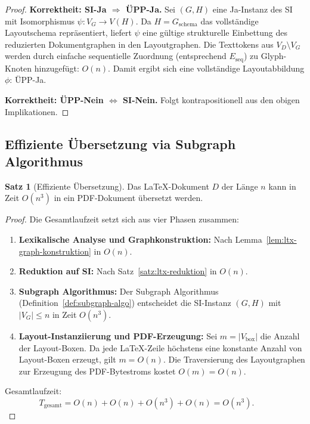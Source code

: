 ﻿\documentclass[a4paper,12pt]{article}
\theoremstyle{definition}
\newtheorem{satz}{Satz}
\begin{document}
\begin{proof}
	\medskip
	\textbf{Korrektheit: SI-Ja $\Rightarrow$ ÜPP-Ja.}
	Sei $(G, H)$ eine Ja-Instanz des SI mit Isomorphismus $\psi: V_G \to V(H)$.
	Da $H = G_{\mathrm{schema}}$ das vollständige Layoutschema repräsentiert,
	liefert $\psi$ eine gültige strukturelle Einbettung des reduzierten
	Dokumentgraphen in den Layoutgraphen. Die Texttokens aus
	$V_D \setminus V_G$ werden durch einfache sequentielle Zuordnung
	(entsprechend $E_{\mathrm{seq}}$) zu Glyph-Knoten hinzugefügt:
	$O(n)$. Damit ergibt sich eine vollständige Layoutabbildung $\phi$:
	ÜPP-Ja. 
	
	\medskip
	\textbf{Korrektheit: ÜPP-Nein $\Leftrightarrow$ SI-Nein.}
	Folgt kontrapositionell aus den obigen Implikationen.
\end{proof}

\subsection{Effiziente Übersetzung via Subgraph Algorithmus}
\label{sec:ltx-effizienz}

\begin{satz}[Effiziente Übersetzung]
	\label{satz:ltx-effizienz}
	Das \LaTeX-Dokument $D$ der Länge $n$ kann in Zeit $O(n^3)$ in ein
	PDF-Dokument übersetzt werden.
\end{satz}

\begin{proof}
	Die Gesamtlaufzeit setzt sich aus vier Phasen zusammen:
	
	\begin{enumerate}
		\item \textbf{Lexikalische Analyse und Graphkonstruktion:}
		Nach Lemma~\ref{lem:ltx-graph-konstruktion} in $O(n)$.
		\item \textbf{Reduktion auf SI:}
		Nach Satz~\ref{satz:ltx-reduktion} in $O(n)$.
		\item \textbf{Subgraph Algorithmus:}
		Der Subgraph Algorithmus (Definition~\ref{def:subgraph-algo})
		entscheidet die SI-Instanz $(G, H)$ mit $|V_G| \le n$ in
		Zeit $O(n^3)$.
		\item \textbf{Layout-Instanziierung und PDF-Erzeugung:}
		Sei $m = |V_{\mathrm{box}}|$ die Anzahl der Layout-Boxen.
		Da jede \LaTeX-Zeile höchstens eine konstante Anzahl von
		Layout-Boxen erzeugt, gilt $m = O(n)$.
		Die Traversierung des Layoutgraphen zur Erzeugung des PDF-Byte\-stroms
		kostet $O(m) = O(n)$.
	\end{enumerate}
	
	Gesamtlaufzeit:
	\[
	T_{\mathrm{gesamt}} = O(n) + O(n) + O(n^3) + O(n) = O(n^3). \qquad 
	\]
\end{proof}
\end{document}
